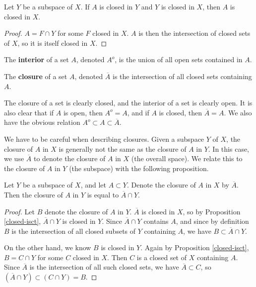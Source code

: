 \documentclass[10pt]{report}
\begin{document}
\begin{prop}
Let $Y$ be a subspace of $X$. If $A$ is closed in $Y$ and $Y$ is closed in $X$, then $A$ is closed in $X$.
\end{prop}
\begin{proof}
	$A = F \cap Y$ for some $F$ closed in $X$. $A$ is then the intersection of closed sets of $X$, so it is itself closed in $X$.
\end{proof}

\begin{defn}
	The \textbf{interior} of a set $A$, denoted $A^o$, is the union of all open sets contained in $A$.

	The \textbf{closure} of a set $A$, denoted $\overline{A}$ is the intersection of all closed sets containing $A$.
\end{defn}

The closure of a set is clearly closed, and the interior of a set is clearly open. It is also clear that if $A$ is open, then $A^o = A$, and if $A$ is closed, then $\overline{A}=A$. We also have the obvious relation $A^o \subset A \subset \overline{A}$.

We have to be careful when describing closures. Given a subspace $Y$ of $X$, the closure of $A$ in $X$ is generally not the same as the closure of $A$ in $Y$. In this case, we use $\overline{A}$ to denote the closure of $A$ in $X$ (the overall space). We relate this to the closure of $A$ in $Y$ (the subspace) with the following proposition.

\begin{prop}
	Let $Y$ be a subspace of $X$, and let $A \subset Y$. Denote the closure of $A$ in $X$ by $\overline{A}$. Then the closure of $A$ in $Y$ is equal to $\overline{A} \cap Y$.
\end{prop}
\begin{proof}
	Let $B$ denote the closure of $A$ in $Y$. $\overline{A}$ is closed in $X$, so by Proposition \ref{closed-isct}, $\overline{A} \cap Y$ is closed in $Y$. Since $\overline{A} \cap Y$ contains $A$, and since by definition $B$ is the intersection of all closed subsets of $Y$ containing $A$, we have $B \subset \overline{A}\cap Y$.

	On the other hand, we know $B$ is closed in $Y$. Again by Proposition \ref{closed-isct}, $B = C \cap Y$ for some $C$ closed in $X$. Then $C$ is a closed set of $X$ containing $A$. Since $\overline{A}$ is the intersection of all such closed sets, we have $\overline{A} \subset C$, so $(\overline{A} \cap Y) \subset (C \cap Y) = B$.
\end{proof}
\end{document}

